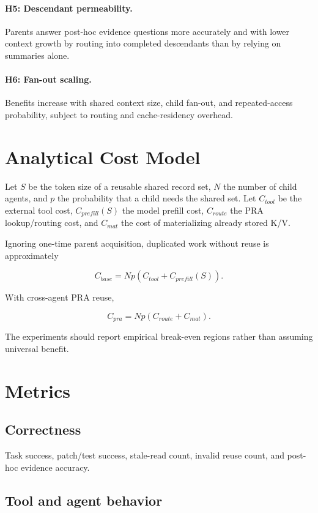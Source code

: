 \documentclass[11pt]{article}
\begin{document}
\paragraph{H5: Descendant permeability.}
Parents answer post-hoc evidence questions more accurately and with lower context growth by routing into completed descendants than by relying on summaries alone.

\paragraph{H6: Fan-out scaling.}
Benefits increase with shared context size, child fan-out, and repeated-access probability, subject to routing and cache-residency overhead.

\section{Analytical Cost Model}

Let $S$ be the token size of a reusable shared record set, $N$ the number of child agents, and $p$ the probability that a child needs the shared set. Let $C_{tool}$ be the external tool cost, $C_{prefill}(S)$ the model prefill cost, $C_{route}$ the PRA lookup/routing cost, and $C_{mat}$ the cost of materializing already stored K/V.

Ignoring one-time parent acquisition, duplicated work without reuse is approximately

\[
C_{base} = Np\left(C_{tool} + C_{prefill}(S)\right).
\]

With cross-agent PRA reuse,

\[
C_{pra} = Np\left(C_{route} + C_{mat}\right).
\]

The experiments should report empirical break-even regions rather than assuming universal benefit.

\section{Metrics}

\subsection{Correctness}

Task success, patch/test success, stale-read count, invalid reuse count, and post-hoc evidence accuracy.

\subsection{Tool and agent behavior}
\end{document}
